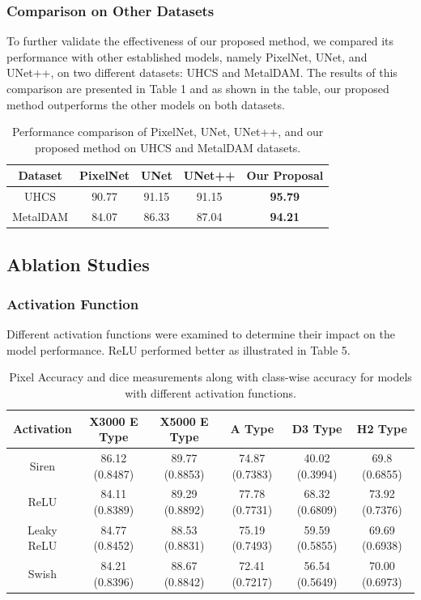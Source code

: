 \documentclass[]{article}
\begin{document}
\subsubsection{Comparison on Other Datasets}

To further validate the effectiveness of our proposed method, we compared its performance with other established models, namely PixelNet, UNet, and UNet++, on two different datasets: UHCS and MetalDAM. The results of this comparison are presented in Table 1 and as shown in the table, our proposed method outperforms the other models on both datasets.

\begin{table}[h!]
	\centering
	\begin{tabular}{|c|c|c|c|c|}
		\hline
		\textbf{Dataset} & \textbf{PixelNet} & \textbf{UNet} & \textbf{UNet++} & \textbf{Our Proposal} \\
		\hline
		UHCS & 90.77 & 91.15 & 91.15 & \textbf{95.79}\\
		\hline
		MetalDAM & 84.07 & 86.33 & 87.04 & \textbf{94.21}\\
		\hline
	\end{tabular}
	\caption{Performance comparison of PixelNet, UNet, UNet++, and our proposed method on UHCS and MetalDAM datasets.}
\end{table} 



\subsection{Ablation Studies}

\subsubsection{Activation Function}
Different activation functions were examined to determine their impact on the model performance. ReLU performed better as illustrated in Table 5.

\begin{table}[h!]
	\centering
	\begin{tabular}{|c|c|c|c|c|c|}
		\hline
		Activation & X3000 E Type & X5000 E Type & A Type & D3 Type & H2 Type \\
		\hline
		Siren & 86.12 (0.8487) & 89.77 (0.8853) & 74.87 (0.7383) & 40.02 (0.3994) & 69.8 (0.6855) \\
		\rowcolor{yellow!30} ReLU & 84.11 (0.8389) & 89.29 (0.8892) & 77.78 (0.7731) & 68.32 (0.6809) & 73.92 (0.7376) \\
		Leaky ReLU & 84.77 (0.8452) & 88.53 (0.8831) & 75.19 (0.7493) & 59.59 (0.5855) & 69.69 (0.6938) \\
		Swish & 84.21 (0.8396) & 88.67 (0.8842) & 72.41 (0.7217) & 56.54 (0.5649) & 70.00 (0.6973) \\
		\hline
	\end{tabular}
	\caption{Pixel Accuracy and dice measurements along with class-wise accuracy for models with different activation functions.}
\end{table}
\end{document}
